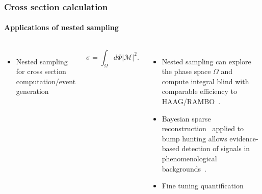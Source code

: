 \documentclass[aspectratio=169,handout]{beamer}
\begin{document}
\begin{frame}
    \frametitle{Cross section calculation}
    \framesubtitle{Applications of nested sampling}
    \begin{columns}
        \begin{columns}
            \begin{itemize}
                \item Nested sampling for cross section computation/event generation
            \end{itemize}
            \[\sigma = \int_\Omega d\Phi |\mathcal{M}|^2.\]
        \end{columns}
        \begin{itemize}
            \item Nested sampling can explore the phase space $\Omega$ and compute integral blind with comparable efficiency to HAAG/RAMBO~.
            \item Bayesian sparse reconstruction~ applied to bump hunting allows evidence-based detection of signals in phenomenological backgrounds~.
            \item Fine tuning quantification
        \end{itemize}

\end{columns}
\end{frame}
\end{document}
